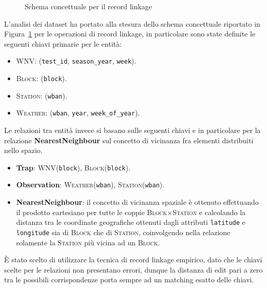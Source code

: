 \begin{figure}[h]
    \centering
    \def\svgwidth{\columnwidth}
    \scalebox{.5}{
        
    }
    \caption{Schema concettuale per il record linkage}
    \label{fig:er-schema}
\end{figure}

L'analisi dei dataset ha portato alla stesura dello schema concettuale 
riportato in Figura~\ref{fig:er-schema} per le operazioni di record linkage, in 
particolare sono state definite le seguenti chiavi primarie per le entità:

\begin{itemize}
    \item \textsc{WNV}: (\texttt{test\_id}, \texttt{season\_year}, 
    \texttt{week}).

    \item \textsc{Block}: (\texttt{block}).
    
    \item \textsc{Station}: (\texttt{wban}).
    
    \item \textsc{Weather}: (\texttt{wban}, \texttt{year}, 
    \texttt{week\_of\_year}).

\end{itemize}


Le relazioni tra entità invece si basano sulle seguenti chiavi e in particolare 
per la relazione \textbf{NearestNeighbour} sul concetto di vicinanza fra 
elementi distribuiti nello spazio.

\begin{itemize}
    \item \textbf{Trap}: \textsc{WNV}(\texttt{block}), 
    \textsc{Block}(\texttt{block}).

    \item \textbf{Observation}:  \textsc{Weather}(\texttt{wban}), 
    \textsc{Station}(\texttt{wban}).
    
    \item \textbf{NearestNeighbour}: il concetto di vicinanza spaziale è 
    ottenuto effettuando il prodotto cartesiano per tutte le coppie
    \textsc{Block}$\times$\textsc{Station} e calcolando la distanza tra le 
    coordinate geografiche ottenuti dagli attributi \texttt{latitude} e 
    \texttt{longitude} sia di \textsc{Block} che di \textsc{Station},
    coinvolgendo nella relazione solamente la \textsc{Station} più vicina ad 
    un \textsc{Block}.

\end{itemize}

È stato scelto di utilizzare la tecnica di record linkage empirico, dato che 
le chiavi scelte per le relazioni non presentano errori, dunque la distanza di 
edit pari a zero tra le possibili corrispondenze porta sempre ad un matching 
esatto delle chiavi.
